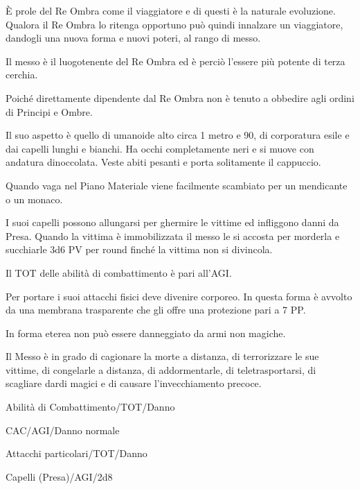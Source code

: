 
\`E prole del Re Ombra come il viaggiatore e di questi \`e la
naturale evoluzione.  Qualora il Re Ombra lo ritenga opportuno pu\`o
quindi innalzare un viaggiatore, dandogli una nuova forma e nuovi
poteri, al rango di messo. 

Il messo \`e il luogotenente del Re Ombra ed \`e perci\`o l'essere pi\`u
potente di terza cerchia.

Poich\'e direttamente dipendente dal Re Ombra non \`e tenuto a
obbedire agli ordini di Principi e Ombre. 

Il suo aspetto \`e quello di umanoide alto circa 1 metro e 90, di
corporatura esile e dai capelli lunghi e bianchi. Ha occhi
completamente neri e si muove con andatura dinoccolata. Veste abiti
pesanti e porta solitamente il cappuccio.

Quando vaga nel Piano Materiale viene facilmente scambiato per un
mendicante o un monaco. 

I suoi capelli possono allungarsi per ghermire le vittime ed
infliggono danni da Presa. Quando la vittima \`e immobilizzata il
messo le si accosta per morderla e succhiarle 3d6 PV per round
finch\'e la vittima non si divincola.

Il TOT delle abilit\`a di combattimento \`e pari all'AGI.

Per portare i suoi attacchi fisici deve divenire corporeo. In questa
forma \`e avvolto da una membrana trasparente che gli offre una
protezione pari a 7 PP.

In forma eterea non pu\`o essere danneggiato da armi non magiche.

Il Messo \`e in grado di cagionare la morte a distanza, di
terrorizzare le sue vittime, di congelarle a distanza, di
addormentarle, di teletrasportarsi, di scagliare dardi magici e di
causare l'invecchiamento precoce.


\begin{parmostro}{Abilit\`a di Combattimento/TOT/Danno}
\item CAC/AGI/Danno normale
\end{parmostro}

\begin{parmostro}{Attacchi particolari/TOT/Danno}
\item Capelli (Presa)/AGI/2d8
\end{parmostro}

